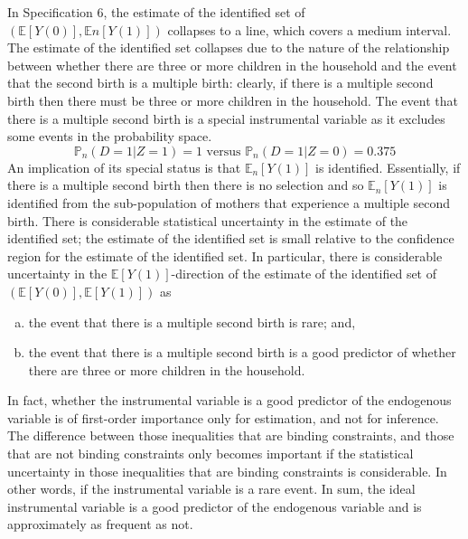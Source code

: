 \documentclass[12pt,a4paper,twoside]{article}
\numberwithin{equation}{section}
\begin{document}
In Specification 6, the estimate of the identified set of $(\mathbb{E}[Y(0)],\mathbb{E}n[Y(1)])$ collapses to a line, which covers a medium interval. The estimate of the identified set collapses due to the nature of the relationship between whether there are three or more children in the household and the event that the second birth is a multiple birth: clearly, if there is a multiple second birth then there must be three or more children in the household. The event that there is a multiple second birth is a special instrumental variable as it excludes some events in the probability space.
\[\mathbb{P}_n(D=1|Z=1)=1\text{ versus }\mathbb{P}_n(D=1|Z=0)=0.375\]
An implication of its special status is that $\mathbb{E}_n[Y(1)]$ is identified. Essentially, if there is a multiple second birth then there is no selection and so $\mathbb{E}_n[Y(1)]$ is identified from the sub-population of mothers that experience a multiple second birth. There is considerable statistical uncertainty in the estimate of the identified set; the estimate of the identified set is small relative to the confidence region for the estimate of the identified set. In particular, there is considerable uncertainty in the $\mathbb{E}[Y(1)]$-direction of the estimate of the identified set of $(\mathbb{E}[Y(0)],\mathbb{E}[Y(1)])$ as
\begin{enumerate}[(a)]
\item the event that there is a multiple second birth is rare; and,
\item the event that there is a multiple second birth is a good predictor of whether there are three or more children in the household.
\end{enumerate}  

In fact, whether the instrumental variable is a good predictor of the endogenous variable is of first-order importance only for estimation, and not for inference. The difference between those inequalities that are binding constraints, and those that are not binding constraints only becomes important if the statistical uncertainty in those inequalities that are binding constraints is considerable. In other words, if the instrumental variable is a rare event. In sum, the ideal instrumental variable is a good predictor of the endogenous variable and is approximately as frequent as not.  
\end{document}
